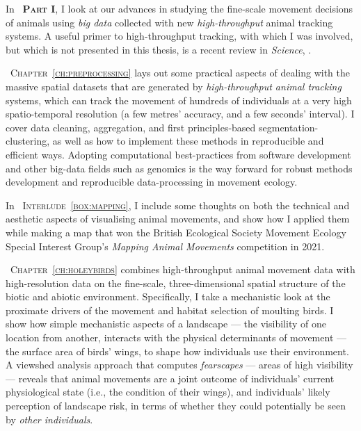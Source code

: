 \medskip

In {\scshape~\textbf{Part I}}, I look at our advances in studying the fine-scale movement decisions of animals using \textit{big data} collected with new \textit{high-throughput} animal tracking systems.
A useful primer to high-throughput tracking, with which I was involved, but which is not presented in this thesis, is a recent review in \textit{Science},  .

\medskip

{\scshape~Chapter~\ref{ch:preprocessing}} lays out some practical aspects of dealing with the massive spatial datasets that are generated by \textit{high-throughput animal tracking} systems, which can track the movement of hundreds of individuals at a very high spatio-temporal resolution (a few metres' accuracy, and a few seconds' interval).
I cover data cleaning, aggregation, and first principles-based segmentation-clustering, as well as how to implement these methods in reproducible and efficient ways.
Adopting computational best-practices from software development and other big-data fields such as genomics is the way forward for robust methods development and reproducible data-processing in movement ecology.

\medskip

In {\scshape~Interlude~\ref{box:mapping}}, I include some thoughts on both the technical and aesthetic aspects of visualising animal movements, and show how I applied them while making a map that won the British Ecological Society Movement Ecology Special Interest Group's \emph{Mapping Animal Movements} competition in 2021.

\medskip

{\scshape~Chapter~\ref{ch:holeybirds}} combines high-throughput animal movement data with high-resolution data on the fine-scale, three-dimensional spatial structure of the biotic and abiotic environment.
Specifically, I take a mechanistic look at the proximate drivers of the movement and habitat selection of moulting birds.
I show how simple mechanistic aspects of a landscape --- the visibility of one location from another, interacts with the physical determinants of movement --- the surface area of birds' wings, to shape how individuals use their environment.
A viewshed analysis approach that computes \textit{fearscapes} --- areas of high visibility --- reveals that animal movements are a joint outcome of individuals' current physiological state (i.e., the condition of their wings), and individuals' likely perception of landscape risk, in terms of whether they could potentially be seen by \textit{other individuals}.

